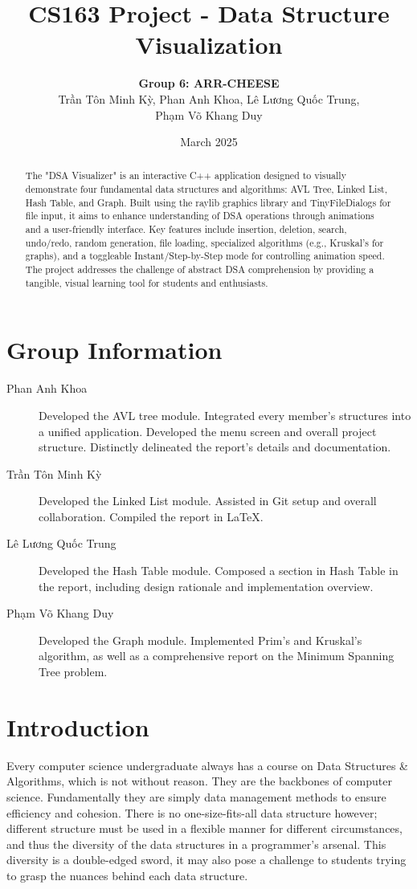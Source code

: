 \documentclass{article}
\title{CS163 Project - Data Structure Visualization}
\author{\textbf{Group 6: ARR-CHEESE}\\\foreignlanguage{vietnamese}{Trần Tôn Minh Kỳ, Phan Anh Khoa, Lê Lương Quốc Trung,}\\\foreignlanguage{vietnamese}{Phạm Võ Khang Duy}}
\date{March 2025}
\begin{document}
\maketitle

\begin{abstract}
    The "DSA Visualizer" is an interactive C++ application designed to visually demonstrate four fundamental data structures and algorithms: AVL Tree, Linked List, Hash Table, and Graph. Built using the raylib graphics library and TinyFileDialogs for file input, it aims to enhance understanding of DSA operations through animations and a user-friendly interface. Key features include insertion, deletion, search, undo/redo, random generation, file loading, specialized algorithms (e.g., Kruskal's for graphs), and a toggleable Instant/Step-by-Step mode for controlling animation speed. The project addresses the challenge of abstract DSA comprehension by providing a tangible, visual learning tool for students and enthusiasts.
\end{abstract}

\tableofcontents

\newpage
\section{Group Information}
\begin{description}
	\item[\foreignlanguage{vietnamese}{Phan Anh Khoa}] Developed the AVL tree module. Integrated every member's structures into a unified application. Developed the menu screen and overall project structure. Distinctly delineated the report's details and documentation.
	\item[\foreignlanguage{vietnamese}{Trần Tôn Minh Kỳ}] Developed the Linked List module. Assisted in Git setup and overall collaboration. Compiled the report in \LaTeX.
	\item[\foreignlanguage{vietnamese}{Lê Lương Quốc Trung}] Developed the Hash Table module. Composed a section in Hash Table in the report, including design rationale and implementation overview.
	\item[\foreignlanguage{vietnamese}{Phạm Võ Khang Duy}] Developed the Graph module. Implemented Prim's and Kruskal's algorithm, as well as a comprehensive report on the Minimum Spanning Tree problem.  
\end{description}

\section{Introduction}
Every computer science undergraduate always has a course on Data Structures \& Algorithms, which is not without reason. They are the backbones of computer science. Fundamentally they are simply data management methods to ensure efficiency and cohesion. There is no one-size-fits-all data structure however; different structure must be used in a flexible manner for different circumstances, and thus the diversity of the data structures in a programmer's arsenal. This diversity is a double-edged sword, it may also pose a challenge to students trying to grasp the nuances behind each data structure.
\end{document}
